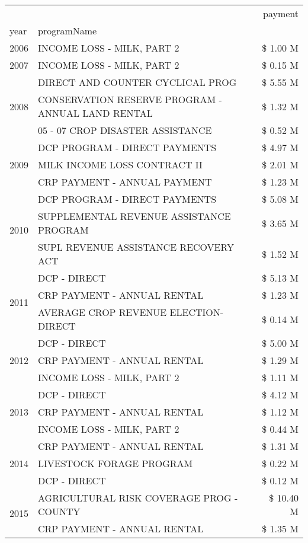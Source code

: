 \begin{tabular}{llr}
\toprule
 &  & payment \\
year & programName &  \\
\midrule
2006 & INCOME LOSS - MILK, PART 2 & \$ 1.00 M \\
\cline{1-3}
2007 & INCOME LOSS - MILK, PART 2 & \$ 0.15 M \\
\cline{1-3}
\multirow[t]{3}{*}{2008} & DIRECT AND COUNTER CYCLICAL PROG & \$ 5.55 M \\
 & CONSERVATION RESERVE PROGRAM - ANNUAL LAND RENTAL & \$ 1.32 M \\
 & 05 - 07 CROP DISASTER ASSISTANCE & \$ 0.52 M \\
\cline{1-3}
\multirow[t]{3}{*}{2009} & DCP PROGRAM - DIRECT PAYMENTS & \$ 4.97 M \\
 & MILK INCOME LOSS CONTRACT II & \$ 2.01 M \\
 & CRP PAYMENT - ANNUAL PAYMENT & \$ 1.23 M \\
\cline{1-3}
\multirow[t]{3}{*}{2010} & DCP PROGRAM - DIRECT PAYMENTS & \$ 5.08 M \\
 & SUPPLEMENTAL REVENUE ASSISTANCE PROGRAM & \$ 3.65 M \\
 & SUPL REVENUE ASSISTANCE RECOVERY ACT & \$ 1.52 M \\
\cline{1-3}
\multirow[t]{3}{*}{2011} & DCP - DIRECT & \$ 5.13 M \\
 & CRP PAYMENT - ANNUAL RENTAL & \$ 1.23 M \\
 & AVERAGE CROP REVENUE ELECTION-DIRECT & \$ 0.14 M \\
\cline{1-3}
\multirow[t]{3}{*}{2012} & DCP - DIRECT & \$ 5.00 M \\
 & CRP PAYMENT - ANNUAL RENTAL & \$ 1.29 M \\
 & INCOME LOSS - MILK, PART 2 & \$ 1.11 M \\
\cline{1-3}
\multirow[t]{3}{*}{2013} & DCP - DIRECT & \$ 4.12 M \\
 & CRP PAYMENT - ANNUAL RENTAL & \$ 1.12 M \\
 & INCOME LOSS - MILK, PART 2 & \$ 0.44 M \\
\cline{1-3}
\multirow[t]{3}{*}{2014} & CRP PAYMENT - ANNUAL RENTAL & \$ 1.31 M \\
 & LIVESTOCK FORAGE PROGRAM & \$ 0.22 M \\
 & DCP - DIRECT & \$ 0.12 M \\
\cline{1-3}
\multirow[t]{3}{*}{2015} & AGRICULTURAL RISK COVERAGE PROG - COUNTY & \$ 10.40 M \\
 & CRP PAYMENT - ANNUAL RENTAL & \$ 1.35 M \\

\end{tabular}
